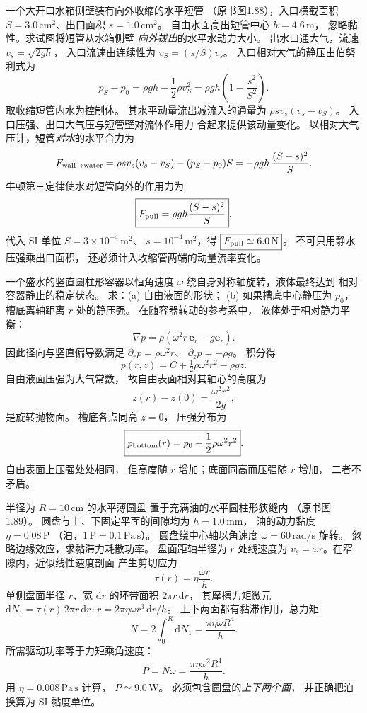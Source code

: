 一个大开口水箱侧壁装有向外收缩的水平短管
（原书图1.88），入口横截面积
$S=3.0\,\mathrm{cm^2}$、出口面积
$s=1.0\,\mathrm{cm^2}$。
自由水面高出短管中心 $h=4.6\,\mathrm m$，
忽略黏性。求试图将短管从水箱侧壁
\emph{向外拔出}的水平水动力大小。
\exsolution
出水口通大气，流速
$v_s=\sqrt{2gh}$，
入口流速由连续性为
$v_S=(s/S)v_s$。
入口相对大气的静压由伯努利式为
\[
p_S-p_0=\rho gh-\frac12\rho v_S^2
=\rho gh\left(1-\frac{s^2}{S^2}\right).
\]
取收缩短管内水为控制体。
其水平动量流出减流入的通量为
$\rho s v_s(v_s-v_S)$。
入口压强、出口大气压与短管壁对流体作用力
合起来提供该动量变化。
以相对大气压计，短管\emph{对水}的水平合力为
\[
F_{{\rm wall}\to{\rm water}}
=\rho s v_s(v_s-v_S)-(p_S-p_0)S
=-\rho gh\,\frac{(S-s)^2}{S}.
\]
牛顿第三定律使水对短管向外的作用力为
\[
\boxed{F_{\rm pull}=\rho gh\frac{(S-s)^2}{S}}.
\]
代入 SI 单位 $S=3\times10^{-4}\,\mathrm{m^2}$、
$s=10^{-4}\,\mathrm{m^2}$，得
$\boxed{F_{\rm pull}\simeq6.0\,\mathrm N}$。
\excheck 不可只用静水压强乘出口面积，
还必须计入收缩管两端的动量流率变化。

一个盛水的竖直圆柱形容器以恒角速度
$\omega$ 绕自身对称轴旋转，液体最终达到
相对容器静止的稳定状态。
求：(a) 自由液面的形状；
(b) 如果槽底中心静压为 $p_0$，
槽底离轴距离 $r$ 处的静压强。
\exsolution
在随容器转动的参考系中，
液体处于相对静力平衡：
\[
\nabla p=\rho(\omega^2r\,\bm e_r-g\bm e_z).
\]
因此径向与竖直偏导数满足
$\partial_rp=\rho\omega^2r$、
$\partial_zp=-\rho g$。
积分得
\[
p(r,z)=C+\tfrac12\rho\omega^2r^2-\rho gz.
\]
自由液面压强为大气常数，
故自由表面相对其轴心的高度为
\[
\boxed{z(r)-z(0)=\frac{\omega^2r^2}{2g}},
\]
是旋转抛物面。
槽底各点同高 $z=0$，
压强分布为
\[
\boxed{p_{\rm bottom}(r)=p_0+\frac12\rho\omega^2r^2}.
\]
\excheck 自由表面上压强处处相同，
但高度随 $r$ 增加；底面同高而压强随 $r$ 增加，
二者不矛盾。

半径为 $R=10\,\mathrm{cm}$ 的水平薄圆盘
置于充满油的水平圆柱形狭缝内
（原书图1.89）。
圆盘与上、下固定平面的间隙均为
$h=1.0\,\mathrm{mm}$，
油的动力黏度
$\eta=0.08\,\mathrm{P}$
（泊，$1\,\mathrm P=0.1\,\mathrm{Pa\,s}$）。
圆盘绕中心轴以角速度
$\omega=60\,\mathrm{rad/s}$ 旋转。
忽略边缘效应，求黏滞力耗散功率。
\exsolution
盘面距轴半径为 $r$ 处线速度为
$v_\theta=\omega r$。在窄隙内，近似线性速度剖面
产生剪切应力
\[
\tau(r)=\eta\frac{\omega r}{h}.
\]
单侧盘面半径 $r$、宽 $\mathrm dr$ 的环带面积
$2\pi r\,\mathrm dr$，
其摩擦力矩微元
$\mathrm dN_1=\tau(r)\,2\pi r\,\mathrm dr\cdot r
=2\pi\eta\omega r^3\,\mathrm dr/h$。
上下两面都有黏滞作用，总力矩
\[
N=2\int_0^R\mathrm dN_1
=\frac{\pi\eta\omega R^4}{h}.
\]
所需驱动功率等于力矩乘角速度：
\[
\boxed{P=N\omega=\frac{\pi\eta\omega^2R^4}{h}}.
\]
用 $\eta=0.008\,\mathrm{Pa\,s}$ 计算，
$\boxed{P\simeq9.0\,\mathrm W}$。
\excheck 必须包含圆盘的\emph{上下两个面}，
并正确把泊换算为 SI 黏度单位。

